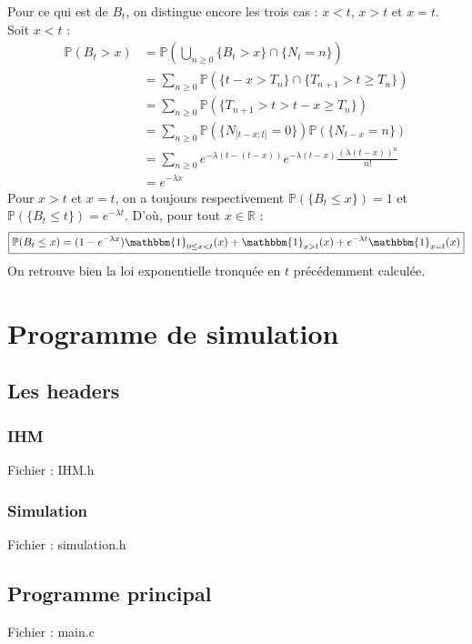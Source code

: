 \documentclass[a4paper, titlepage]{livret} %
\begin{document}
		Pour ce qui est de $B_{t}$, on distingue encore les trois cas : $x < t$, $x > t$ et $x = t$.\\
		Soit $x < t$ :
		\[\begin{aligned}
			\mathbb{P}(B_{t} > x) & = \mathbb{P}\left(\bigcup_{n \geq 0} \{B_{t} > x\} \cap \{N_{t} = n\}\right)\\
								  & = \sum_{n \geq 0} \mathbb{P}(\{t - x > T_{n}\} \cap \{T_{n+1} > t \geq T_{n}\})\\
								  & = \sum_{n \geq 0} \mathbb{P}(\{T_{n+1} > t > t - x \geq T_{n}\})\\
								  & = \sum_{n \geq 0} \mathbb{P}(\{N_{]t-x;t]} = 0\}) \mathbb{P}(\{N_{t-x} = n\})\\
								  & = \sum_{n \geq 0} e^{-\lambda (t - (t-x))} e^{-\lambda (t - x)} \frac{(\lambda (t - x))^{n}}{n!}\\
								  & = e^{-\lambda x}
		\end{aligned}\]
		Pour $x > t$ et $x = t$, on a toujours respectivement $\mathbb{P}(\{B_{t} \leq x\}) = 1$ et $\mathbb{P}(\{B_{t} \leq t\}) = e^{-\lambda t}$.
		D'où, pour tout $x \in \mathbb{R}$ :
		\[\boxed{
			\mathbb{P}(B_{t} \leq x) = (1 - e^{-\lambda x})\mathbbm{1}_{0 \leq x < t}(x) + \mathbbm{1}_{x > t}(x) + e^{-\lambda t}\mathbbm{1}_{x = t}(x)
		}\]
		On retrouve bien la loi exponentielle tronquée en $t$ précédemment calculée.

	
	\chapter{Programme de simulation}
		\lstset{language=C,
			inputencoding=utf8/latin1
			}

		\section{Les headers}
			\subsection{IHM}
				Fichier : IHM.h
	
				
			
			\subsection{Simulation}
				Fichier : simulation.h
	
				
	
		\section{Programme principal}
			Fichier : main.c
	
\end{document}
